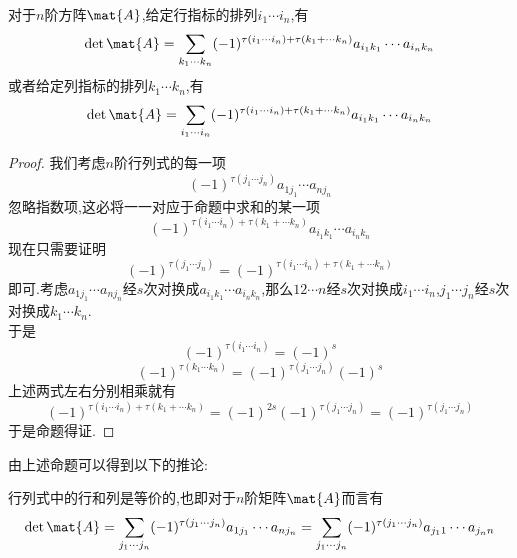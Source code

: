 \documentclass{ctexart}
\begin{document}
\begin{theorem}
    对于$n$阶方阵$\mat{A}$,给定行指标的排列$i_1\cdots i_n$,有
    \[\det\mat{A}=\sum_{k_1\cdots k_n}(-1)^{\tau\left(i_1\cdots i_n\right)+\tau\left(k_1+\cdots k_n\right)}a_{i_1k_1}\cdots a_{i_nk_n}\]
    或者给定列指标的排列$k_1\cdots k_n$,有
    \[\det\mat{A}=\sum_{i_1\cdots i_n}(-1)^{\tau\left(i_1\cdots i_n\right)+\tau\left(k_1+\cdots k_n\right)}a_{i_1k_1}\cdots a_{i_nk_n}\]
\end{theorem}
\begin{proof}
    我们考虑$n$阶行列式的每一项
    \[(-1)^{\tau\left(j_1\cdots j_n\right)}a_{1j_1}\cdots a_{nj_n}\]
    忽略指数项,这必将一一对应于命题中求和的某一项
    \[(-1)^{\tau\left(i_1\cdots i_n\right)+\tau\left(k_1+\cdots k_n\right)}a_{i_1k_1}\cdots a_{i_nk_n}\]
    现在只需要证明
    \[(-1)^{\tau\left(j_1\cdots j_n\right)}=(-1)^{\tau\left(i_1\cdots i_n\right)+\tau\left(k_1+\cdots k_n\right)}\]
    即可.考虑$a_{1j_1}\cdots a_{nj_n}$经$s$次对换成$a_{i_1k_1}\cdots a_{i_nk_n}$,那么$12\cdots n$经$s$次对换成$i_1\cdots i_n$,$j_1\cdots j_n$经$s$次对换成$k_1\cdots k_n$.\\
    于是
    \[(-1)^{\tau\left(i_1\cdots i_n\right)}=(-1)^s\]
    \[(-1)^{\tau\left(k_1\cdots k_n\right)}=(-1)^{\tau\left(j_1\cdots j_n\right)}(-1)^s\]
    上述两式左右分别相乘就有
    \[(-1)^{\tau\left(i_1\cdots i_n\right)+\tau\left(k_1+\cdots k_n\right)}=(-1)^{2s}(-1)^{\tau\left(j_1\cdots j_n\right)}=(-1)^{\tau\left(j_1\cdots j_n\right)}\]
    于是命题得证.
\end{proof}
由上述命题可以得到以下的推论:
\begin{lemma}
    行列式中的行和列是等价的,也即对于$n$阶矩阵$\mat{A}$而言有
    \[\det\mat{A}=\sum_{j_1\cdots j_n}(-1)^{\tau\left(j_1\cdots j_n\right)}a_{1j_1}\cdots a_{nj_n}=\sum_{j_1\cdots j_n}(-1)^{\tau\left(j_1\cdots j_n\right)}a_{j_11}\cdots a_{j_nn}\]
\end{lemma}
\end{document}
